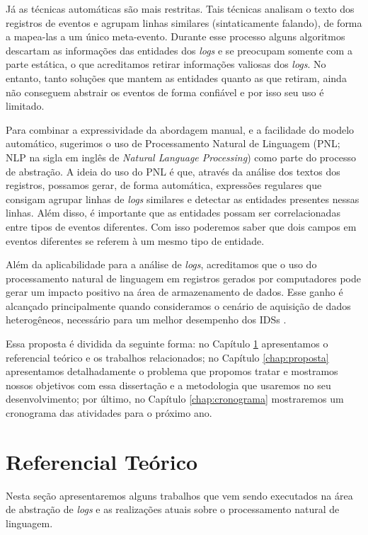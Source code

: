 \documentclass[
	12pt,				%
	openright,			%
	twoside,			%
	a4paper,			%
	english,			%
	spanish,			%
	brazil,				%
	]{abntex2}
\begin{document}
Já as técnicas automáticas são mais restritas. Tais técnicas analisam o texto dos registros de eventos e agrupam linhas similares (sintaticamente falando), de forma a mapea-las a um único meta-evento. Durante esse processo alguns algoritmos descartam as informações das entidades dos \emph{logs} e se preocupam somente com a parte estática, o que acreditamos retirar informações valiosas dos \emph{logs}. No entanto, tanto soluções que mantem as entidades quanto as que retiram, ainda não conseguem abstrair os eventos de forma confiável e por isso seu uso é limitado.

Para combinar a expressividade da abordagem manual, e a facilidade do modelo automático, sugerimos o uso de Processamento Natural de Linguagem (PNL; NLP na sigla em inglês de \emph{Natural Language Processing}) como parte do processo de abstração. A ideia do uso do PNL é que, através da análise dos textos dos registros, possamos gerar, de forma automática, expressões regulares que consigam agrupar linhas de \emph{logs} similares e detectar as entidades presentes nessas linhas. Além disso, é importante que as entidades possam ser correlacionadas entre tipos de eventos diferentes. Com isso poderemos saber que dois campos em eventos  diferentes se referem à um mesmo tipo de entidade.

Além da aplicabilidade para a análise de \emph{logs}, acreditamos que o uso do processamento natural de linguagem em registros gerados por computadores pode gerar um impacto positivo na área de armazenamento de dados. Esse ganho é alcançado principalmente quando consideramos o cenário de aquisição de dados heterogêneos, necessário para um melhor desempenho dos IDSs \cite{zuech2015intrusion}.

Essa proposta é dividida da seguinte forma: no Capítulo \ref{chap:referencial} apresentamos o referencial teórico e os trabalhos relacionados; no Capítulo \ref{chap:proposta} apresentamos detalhadamente o problema que propomos tratar e mostramos nossos objetivos com essa dissertação e a metodologia que usaremos no seu desenvolvimento; por último, no Capítulo \ref{chap:cronograma} mostraremos um cronograma das atividades para o próximo ano.

\chapter{Referencial Teórico}\label{chap:referencial}

Nesta seção apresentaremos alguns trabalhos que vem sendo executados na área de abstração de \emph{logs} e as realizações atuais sobre o processamento natural de linguagem.
\end{document}
